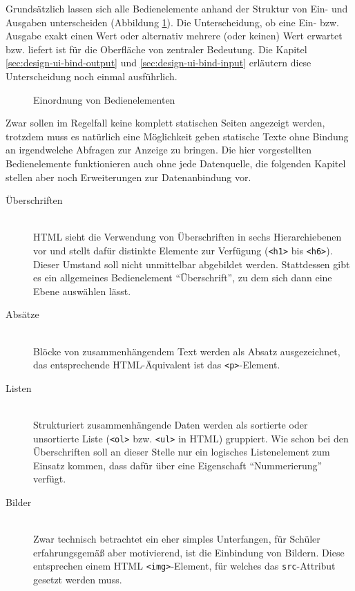 Grundsätzlich lassen sich alle Bedienelemente anhand der Struktur von Ein- und Ausgaben unterscheiden (Abbildung \ref{fig:ui-element-concept}). Die Unterscheidung, ob eine Ein- bzw. Ausgabe exakt einen Wert oder alternativ mehrere (oder keinen) Wert erwartet bzw. liefert ist für die Oberfläche von zentraler Bedeutung. Die Kapitel \ref{sec:design-ui-bind-output}  und \ref{sec:design-ui-bind-input}  erläutern diese Unterscheidung noch einmal ausführlich.

\begin{figure}[p]
  \centering 
  \caption{Einordnung von Bedienelementen}
  \label{fig:ui-element-concept}
\end{figure}

Zwar sollen im Regelfall keine komplett statischen Seiten angezeigt werden, trotzdem muss es natürlich eine Möglichkeit geben statische Texte ohne Bindung an irgendwelche Abfragen zur Anzeige zu bringen. Die hier vorgestellten Bedienelemente funktionieren auch ohne jede Datenquelle, die folgenden Kapitel stellen aber noch Erweiterungen zur Datenanbindung vor.

\begin{description}
\item[Überschriften] \hfill \\
  HTML sieht die Verwendung von Überschriften in sechs Hierarchiebenen vor und stellt dafür distinkte Elemente zur Verfügung (\texttt{<h1>} bis \texttt{<h6>}). Dieser Umstand soll nicht unmittelbar abgebildet werden. Stattdessen gibt es ein allgemeines Bedienelement ``Überschrift'', zu dem sich dann eine Ebene auswählen lässt.
\item[Absätze] \hfill \\
  Blöcke von zusammenhängendem Text werden als Absatz ausgezeichnet, das entsprechende HTML-Äquivalent ist das \texttt{<p>}-Element.
\item[Listen] \hfill \\
  Strukturiert zusammenhängende Daten werden als sortierte oder unsortierte Liste (\texttt{<ol>} bzw. \texttt{<ul>} in HTML) gruppiert. Wie schon bei den Überschriften soll an dieser Stelle nur ein logisches Listenelement zum Einsatz kommen, dass dafür über eine Eigenschaft ``Nummerierung'' verfügt.      
\item[Bilder] \hfill \\
  Zwar technisch betrachtet ein eher simples Unterfangen, für Schüler erfahrungsgemäß aber motivierend, ist die Einbindung von Bildern. Diese entsprechen einem HTML \texttt{<img>}-Element, für welches das \texttt{src}-Attribut gesetzt werden muss.
\end{description}

